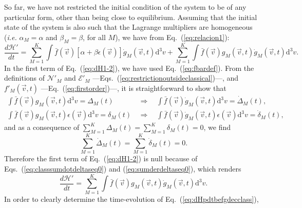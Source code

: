 So far, we have not restricted the initial condition of the system to be
of any particular form, other than being close to equilibrium. Assuming
that the initial state of the system is also such that the Lagrange multipliers
are homogeneous (\textit{i.e.} $\alpha_M=\alpha$ and $\beta_M=\beta$, for all $M$),
we have from Eq.~(\ref{eq:relacion1}):
%
\begin{equation}\label{eq:dH1-2}
    \frac{d\mathcal{H}'}{dt} = \sum_{M=1}^{K}\int\bar f(\vec{v})\left[
      \alpha+\beta \epsilon(\vec{v})
    \right]\dot g_M(\vec{v},t)\mathrm{d}^3v +\sum_{M=1}^{K}
    \int\bar f(\vec{v})g_M(\vec{v},t)\dot g_M(\vec{v},t)\mathrm{d}^3v .
\end{equation}
%
In the first term of Eq.~(\ref{eq:dH1-2}), we have used Eq.~(\ref{eq:fbardef}).
From the definitions of $\mathcal{N}'_M$ and $\mathcal{E}'_M$ 
---Eqs.~(\ref{eq:restrictionoutsideclassical})---, and $f'_{M}(\vec{v},t)$
---Eq.~(\ref{eq:firstorder})---, it is straightforward to show that
%
\begin{subequations}\label{eq:classsumdotdeltaseq0}
\begin{eqnarray}
    \int \bar{f}(\vec{v}) g_{M}(\vec{v},t) \mathrm{d}^{3}v=\Delta_M(t) \ \  &\Rightarrow&
    \ \  \int \bar{f}(\vec{v}) \dot{g}_{M}(\vec{v},t)\mathrm{d}^{3}v=\dot{\Delta}_M(t), \\
    \int  \bar{f}(\vec{v}) g_{M}(\vec{v},t)\epsilon(\vec{v}) \mathrm{d}^{3}v=\delta_M(t) \ \  &\Rightarrow&
    \ \  \int \bar{f}(\vec{v}) \dot{g}_{M}(\vec{v},t)\epsilon(\vec{v}) \mathrm{d}^{3}v=\dot{\delta}_M(t),
\end{eqnarray}
\end{subequations}
%
and as a consequence of $\sum_{M=1}^{K} \Delta_M(t) =\sum_{M=1}^{K} \delta_M(t) =0$,
we find
%
\begin{equation}\label{eq:sumderdeltaseq0}
    \sum_{M=1}^{K} \dot{\Delta}_M(t)  =\sum_{M=1}^{K} \dot{\delta}_{M}(t) =0.
\end{equation}
%
Therefore the first term of Eq.~(\ref{eq:dH1-2}) is null because of
Eqs.~(\ref{eq:classsumdotdeltaseq0}) and (\ref{eq:sumderdeltaseq0}), which renders
%
\begin{equation}\label{eq:dHpdtbefgdecclass}
  \frac{d\mathcal{H}'}{dt} = \sum_{M=1}^{K}\int\bar f(\vec{v})g_M(\vec{v},t)\dot g_M(\vec{v},t)\mathrm{d}^3v.
\end{equation}
%
In order to clearly determine the time-evolution of Eq.~(\ref{eq:dHpdtbefgdecclass}),
